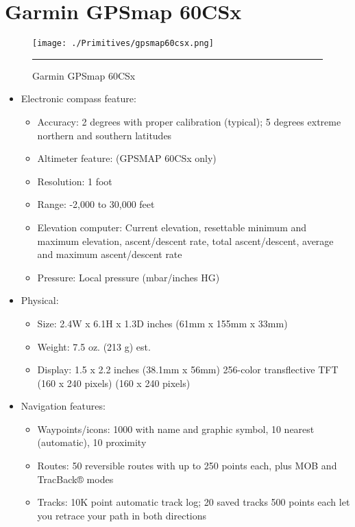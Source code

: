 \chapter{Garmin GPSmap 60CSx}
\label{AppendixC}

\begin{figure}[htbp]
  \centering
    \texttt{[image: ./Primitives/gpsmap60csx.png]}
    \rule{35em}{0.5pt}
  \caption[Garmin GPSmap 60CSx]{Garmin GPSmap 60CSx}
\end{figure}

\begin{itemize}
	\item Electronic compass feature:
		\begin{itemize}
			\item Accuracy: 2 degrees with proper calibration (typical); 5 degrees extreme northern and southern latitudes 
			\item Altimeter feature: (GPSMAP 60CSx only) 
			\item Resolution: 1 foot 
			\item Range: -2,000 to 30,000 feet 
			\item Elevation computer: Current elevation, resettable minimum and maximum elevation, ascent/descent rate, total ascent/descent, average and maximum ascent/descent rate 
			\item Pressure: Local pressure (mbar/inches HG) 
		\end{itemize}
	\item Physical:
		\begin{itemize}
			\item Size: 2.4W x 6.1H x 1.3D inches (61mm x 155mm x 33mm) 
			\item Weight: 7.5 oz. (213 g) est. 
			\item Display: 1.5 x 2.2 inches (38.1mm x 56mm) 256-color transflective TFT (160 x 240 pixels) (160 x 240 pixels) 
  		\end{itemize}
	\item Navigation features:
		\begin{itemize}
			\item Waypoints/icons: 1000 with name and graphic symbol, 10 nearest (automatic), 10 proximity 
			\item Routes: 50 reversible routes with up to 250 points each, plus MOB and TracBack® modes 
			\item Tracks: 10K point automatic track log; 20 saved tracks 500 points each let you retrace your path in both directions

\end{itemize}
\end{itemize}
